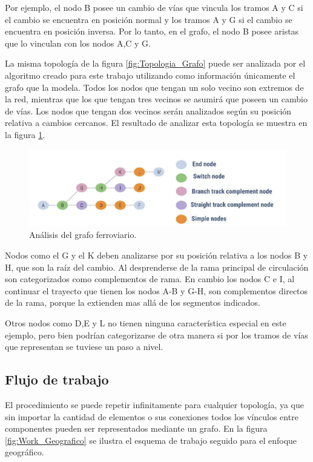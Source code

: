 		Por ejemplo, el nodo B posee un cambio de vías que vincula los tramos A y C si el cambio se encuentra en posición normal y los tramos A y G si el cambio se encuentra en posición inversa. Por lo tanto, en el grafo, el nodo B posee aristas que lo vinculan con los nodos A,C y G.
		
		La misma topología de la figura \ref{fig:Topologia_Grafo} puede ser analizada por el algoritmo creado para este trabajo utilizando como información únicamente el grafo que la modela. Todos los nodos que tengan un solo vecino son extremos de la red, mientras que los que tengan tres vecinos se asumirá que poseen un cambio de vías. Los nodos que tengan dos vecinos serán analizados según su posición relativa a cambios cercanos. El resultado de analizar esta topología se muestra en la figura \ref{fig:Grafo_Analisis}.
	
		\begin{figure}[h]
		\centering
			\includegraphics[scale=.4]{./Figures/Grafo}
			\caption{Análisis del grafo ferroviario.}
			\label{fig:Grafo_Analisis}
		\end{figure}
	
		Nodos como el G y el K deben analizarse por su posición relativa a los nodos B y H, que son la raíz del cambio. Al desprenderse de la rama principal de circulación son categorizados como complementos de rama. En cambio los nodos C e I, al continuar el trayecto que tienen los nodos A-B y G-H, son complementos directos de la rama, porque la extienden mas allá de los segmentos indicados.
		
		Otros nodos como D,E y L no tienen ninguna característica especial en este ejemplo, pero bien podrían categorizarse de otra manera si por los tramos de vías que representan se tuviese un paso a nivel.
	
		\subsection{Flujo de trabajo}
		
		El procedimiento se puede repetir infinitamente para cualquier topología, ya que sin importar la cantidad de elementos o sus conexiones todos los vínculos entre componentes pueden ser representados mediante un grafo. En la figura \ref{fig:Work_Geografico} se ilustra el esquema de trabajo seguido para el enfoque geográfico.	
		
